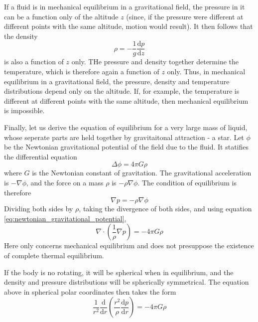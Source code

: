 \documentclass[conference]{IEEEtran}
\theoremstyle{definition}
\theoremstyle{remark}
\begin{document}
    If a fluid is in mechanical equilibrium in a gravitational field, the pressure in it can be a function only of the altitude $z$ (since, if the pressure were different at different points with the same altitude, motion would result). It then follows that the density
    \begin{equation}
        \rho = -\dfrac1{g} \dfrac{\mathrm{d} p}{\mathrm{d} z}
    \end{equation}
    is also a function of $z$ only. THe pressure and density together determine the temperature, which is therefore again a function of $z$ only. Thus, in mechanical equilibrium in a gravitational field, the pressure, density and temperature distributions depend only on the altitude. If, for example, the temperature is different at different points with the same altitude, then mechanical equilibrium is impossible.

    Finally, let us derive the equation of equilibrium for a very large mass of liquid, whose seperate parts are held together by gravitaitonal attraction - a star. Let $\phi$ be the Newtonian gravitational potential of the field due to the fluid. It statifies the differential equation
    \begin{equation}
        \Delta \phi = 4 \pi G \rho
        \label{eq:newtonian_gravitational_potential}
    \end{equation}
    where $G$ is the Newtonian constant of gravitation. The gravitational acceleration is $-\nabla \phi$, and the force on a mass $\rho$ is $-\rho \nabla \phi$. The condition of equilibrium is therefore
    \[
        \nabla p = - \rho \nabla \phi
    \]
    Dividing both sides by $\rho$, taking the divergence of both sides, and using equation \ref{eq:newtonian_gravitational_potential},
    \begin{equation}
        \nabla \cdot \left( \dfrac1\rho \nabla p \right) = -4\pi G\rho
    \end{equation}
    Here only concerns mechanical equilibrium and does not presuppose the existence of complete thermal equilibrium.

    If the body is no rotating, it will be spherical when in equilibrium, and the density and pressure distributions will be spherically symmetrical. The equation above in spherical polar coordinates then takes the form
    \begin{equation}
        \dfrac1{r^2} \dfrac{\mathrm{d}}{\mathrm{d} r} \left( \dfrac{r^2}{\rho} \dfrac{\mathrm{d} p}{\mathrm{d} r} \right) = -4\pi G\rho
    \end{equation}
\end{document}
